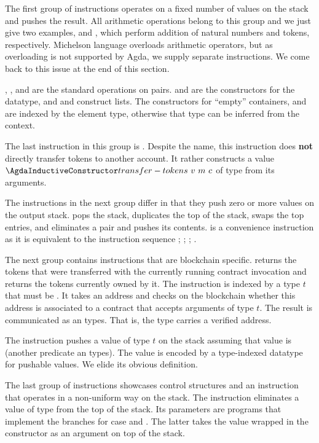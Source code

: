 The first group of instructions operates on a fixed number of values on
the stack and pushes the result. All arithmetic operations belong to
this group and we just give two examples, {\AADDnn}  and {\AADDm},
which perform addition of natural numbers and tokens, respectively.
Michelson language overloads arithmetic operators, but as
overloading is not supported by Agda, we supply separate
instructions. We come back to this issue at the end of this section. 

, , and  are the standard operations on
pairs.  and  are the constructors for the
 datatype, and  and  construct
lists. The constructors for ``empty'' containers,  and
 are indexed by the element type, otherwise that type can be
inferred from the context.

The last instruction in this group is . Despite
the name, this instruction does \textbf{not} directly transfer tokens
to another account. It rather constructs a value
{$\AtransferTokens~v~m~c$} of type {\Aoperation} from its arguments.

The instructions in the next group differ in that they push zero or more
values on the output stack.  pops the stack,  duplicates the top of the
stack,  swaps the top entries, and  eliminates
a pair and pushes its contents.  is a convenience
instruction as it is equivalent to the instruction sequence
; ; ; . 

The next group contains instructions that are blockchain
specific.  returns the tokens that were transferred with
the currently running contract invocation and   returns
the tokens currently owned by it. The  instruction is
indexed by a type $t$ that must be {\APassable}. It takes an address
and checks on the blockchain whether this address is associated to a
contract that accepts arguments of type $t$. The result is
communicated as an  types. That is, the {\Acontract} type
carries a verified address.

The  instruction pushes a value of type $t$ on the stack
assuming that value is {\APushable} (another predicate an types). The
value is encoded by a type-indexed datatype  for
pushable values. We elide its obvious definition.

The last group of instructions showcases control structures and an
instruction that operates in a non-uniform way on the stack. The
instruction  eliminates a value of  type from the
top of the stack. Its parameters are programs that implement the branches for case 
and . The latter takes the value wrapped in the 
constructor as an argument on top of the stack.


